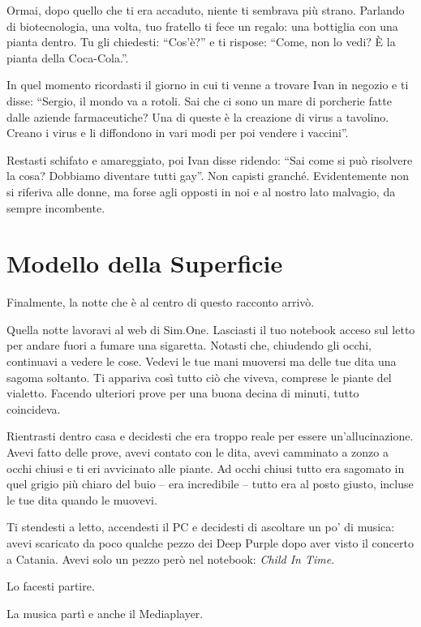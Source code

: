 Ormai, dopo quello che ti era accaduto, niente ti sembrava più strano. Parlando di biotecnologia, una volta, tuo fratello ti fece un regalo: una bottiglia con una pianta dentro. Tu gli chiedesti: ``Cos'è?'' e ti rispose: “Come, non lo vedi? È la pianta della Coca-Cola.”.

In quel momento ricordasti il giorno in cui ti venne a trovare Ivan in negozio e ti disse: “Sergio, il mondo va a rotoli. Sai che ci sono un mare di porcherie fatte dalle aziende farmaceutiche? Una di queste è la creazione di virus a tavolino. Creano i virus e li diffondono in vari modi per poi vendere i vaccini”.

Restasti schifato e amareggiato, poi Ivan disse ridendo: “Sai come si può risolvere la cosa? Dobbiamo diventare tutti gay”. Non capisti granché. Evidentemente non si riferiva alle donne, ma forse agli opposti in noi e al nostro lato malvagio, da sempre incombente.

\section{Modello della Superficie}
\label{modello_di_superficie}

Finalmente, la notte che è al centro di questo racconto arrivò.

Quella notte lavoravi al web di Sim.One. Lasciasti il tuo notebook acceso sul letto per andare fuori a fumare una sigaretta. Notasti che, chiudendo gli occhi, continuavi a vedere le cose. Vedevi le tue mani muoversi ma delle tue dita una sagoma soltanto. Ti appariva così tutto ciò che viveva, comprese le piante del vialetto. Facendo ulteriori prove per una buona decina di minuti, tutto coincideva.

Rientrasti dentro casa e decidesti che era troppo reale per essere un'allucinazione. Avevi fatto delle prove, avevi contato con le dita, avevi camminato a zonzo a occhi chiusi e ti eri avvicinato alle piante. Ad occhi chiusi tutto era sagomato in quel grigio più chiaro del buio -- era incredibile -- tutto era al posto giusto, incluse le tue dita quando le muovevi.

Ti stendesti a letto, accendesti il PC e decidesti di ascoltare un po' di musica: avevi scaricato da poco qualche pezzo dei Deep Purple dopo aver visto il concerto a Catania. Avevi solo un pezzo però nel notebook: \textit{Child In Time}.

Lo facesti partire.

La musica partì e anche il Mediaplayer.


